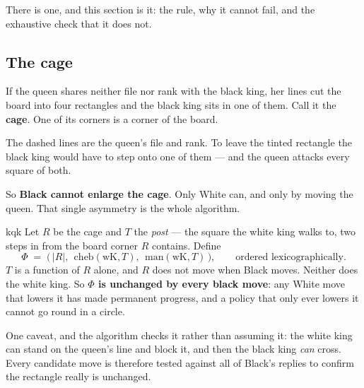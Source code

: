 \documentclass[11pt]{article}
\begin{document}
There is one, and this section is it: the rule, why it cannot fail, and the
exhaustive check that it does not.

\subsection{The cage}\label{sub:cage}

If the queen shares neither file nor rank with the black king, her lines cut
the board into four rectangles and the black king sits in one of them. Call it
the \textbf{cage}. One of its corners is a corner of the board.

\begin{center}
\begin{minipage}{0.36\textwidth}\centering
\end{minipage}\hspace{6mm}
\begin{minipage}{0.52\textwidth}\small
The dashed lines are the queen's file and rank. To leave the tinted
rectangle the black king would have to step onto one of them --- and the queen
attacks every square of both.

\smallskip
So \textbf{Black cannot enlarge the cage}. Only White can, and only by moving
the queen. That single asymmetry is the whole algorithm.
\end{minipage}
\end{center}

\begin{result}[title={The one quantity Black cannot fight}]{kqk}
Let $R$ be the cage and $T$ the \emph{post} --- the square the white king walks
to, two steps in from the board corner $R$ contains. Define
\[ \Phi \;=\; \bigl(\,|R|,\ \ \mathrm{cheb}(\text{wK},T),\ \
   \mathrm{man}(\text{wK},T)\,\bigr),\qquad\text{ordered lexicographically.} \]
$T$ is a function of $R$ alone, and $R$ does not move when Black moves. Neither
does the white king. So \textbf{$\Phi$ is unchanged by every black move}: any
White move that lowers it has made permanent progress, and a policy that only
ever lowers it cannot go round in a circle.

\medskip
One caveat, and the algorithm checks it rather than assuming it: the white
king can stand on the queen's line and block it, and then the black king
\emph{can} cross. Every candidate move is therefore tested against all of
Black's replies to confirm the rectangle really is unchanged.
\end{result}
\end{document}
